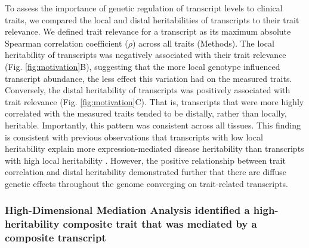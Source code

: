 \documentclass[
]{article}
\begin{document}
To assess the importance of genetic regulation of transcript levels to
clinical traits, we compared the local and distal heritabilities of
transcripts to their trait relevance. We defined trait relevance for a
transcript as its maximum absolute Spearman correlation coefficient
(\(\rho\)) across all traits (Methods). The local heritability of
transcripts was negatively associated with their trait relevance (Fig.
\ref{fig:motivation}B), suggesting that the more local genotype
influenced transcript abundance, the less effect this variation had on
the measured traits. Conversely, the distal heritability of transcripts
was positively associated with trait relevance (Fig.
\ref{fig:motivation}C). That is, transcripts that were more highly
correlated with the measured traits tended to be distally, rather than
locally, heritable. Importantly, this pattern was consistent across all
tissues. This finding is consistent with previous observations that
transcripts with low local heritability explain more expression-mediated
disease heritability than transcripts with high local heritability
\cite{pmid32424349}. However, the positive relationship between trait
correlation and distal heritability demonstrated further that there are
diffuse genetic effects throughout the genome converging on
trait-related transcripts.

\subsubsection{High-Dimensional Mediation Analysis identified a
high-heritability composite trait that was mediated by a composite
transcript}\label{high-dimensional-mediation-analysis-identified-a-high-heritability-composite-trait-that-was-mediated-by-a-composite-transcript}
\end{document}
